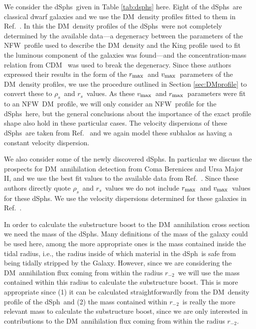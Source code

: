 \documentclass[aps,prd,twocolumn,amsmath,amssymb,floatfix,nofootinbib,10pt]{revtex4}
\newcommand{\ie}{i.e.}
\newcommand{\CDM}{CDM}
\newcommand{\NFW}{NFW}
\newcommand{\DM}{DM}
\newcommand{\rhos}{\ensuremath{\rho_s}}
\newcommand{\rs}{\ensuremath{r_s}}
\newcommand{\rminustwo}{\ensuremath{r_{-2}}}
\newcommand{\vmax}{\ensuremath{v_{\mbox{{\footnotesize max}}}}}
\newcommand{\rmax}{\ensuremath{r_{\mbox{{\footnotesize max}}}}}
\newcommand{\dSph}{dSph}
\newcommand{\dSphs}{dSphs}
\begin{document}
We consider the \dSphs\ given in Table \ref{tab:dsphs} here. Eight of
the \dSphs\ are classical dwarf galaxies and we use the \DM\ density
profiles fitted to them in Ref.~\cite{2008ApJ...672..904P}. In this
the \DM\ density profiles of the \dSphs\ were not completely
determined by the available data---a degeneracy between the
parameters of the \NFW\ profile used to describe the \DM\ density and
the King profile used to fit the luminous component of the galaxies
was found---and the concentration-mass relation from \CDM\
\cite{2001MNRAS.321..559B,2001ApJ...554..114E} was used to break the
degeneracy. Since these authors expressed their results in the form of
the \rmax\ and \vmax\ parameters of the \DM\ density profiles, we use
the procedure outlined in Section \ref{sec:DMprofile} to convert these
to \rhos\ and \rs\ values. As these \vmax\ and \rmax\ parameters were
fit to an \NFW\ \DM\ profile, we will only consider an \NFW\ profile
for the \dSphs\ here, but the general conclusions about the importance
of the exact profile shape also hold in these particular cases. The
velocity dispersions of these \dSphs\ are taken from
Ref.~\cite{1998ARA&A..36..435M} and we again model these subhalos as
having a constant velocity dispersion.

We also consider some of the newly discovered \dSphs. In particular we
discuss the prospects for \DM\ annihilation detection from Coma
Berenices and Ursa Major II, and we use the best fit values to the
available data from Ref.~\cite{2008ApJ...678..614S}. Since these
authors directly quote \rhos\ and \rs\ values we do not include \rmax\
and \vmax\ values for these \dSphs. We use the velocity dispersions
determined for these galaxies in Ref.~\cite{2007ApJ...670..313S}.

In order to calculate the substructure boost to the \DM\ annihilation
cross section we need the mass of the \dSphs. Many definitions of the
mass of the galaxy could be used here, among the more appropriate ones
is the mass contained inside the tidal radius, \ie, the radius inside
of which material in the \dSph\ is safe from being tidally stripped by
the Galaxy. However, since we are considering the \DM\ annihilation
flux coming from within the radius \rminustwo\ we will use the mass
contained within this radius to calculate the substructure boost. This
is more appropriate since (1) it can be calculated straightforwardly
from the \DM\ density profile of the \dSph\ and (2) the mass contained
within \rminustwo\ is really the more relevant mass to calculate the
substructure boost, since we are only interested in contributions to
the \DM\ annihilation flux coming from within the radius \rminustwo.
\end{document}
